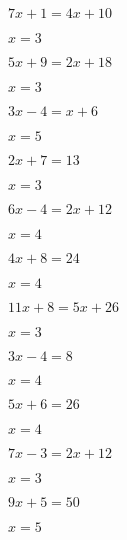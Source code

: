 \documentclass{ximera}
\begin{document}
\begin{exercise}
\begin{xmmulticols}
  \begin{question} \( 7x + 1  =  4x + 10    \) \begin{oplossing} \( x  = 3  \) \end{oplossing} \end{question}
  \begin{question} \( 5x + 9  =  2x + 18    \) \begin{oplossing} \( x  = 3  \) \end{oplossing} \end{question}
  \begin{question} \( 3x - 4  =  x + 6      \) \begin{oplossing} \( x  = 5  \) \end{oplossing} \end{question}
  \begin{question} \( 2x + 7  =  13         \) \begin{oplossing} \( x  = 3  \) \end{oplossing} \end{question}
  \begin{question} \( 6x - 4  =  2x + 12    \) \begin{oplossing} \( x  = 4  \) \end{oplossing} \end{question}
  \begin{question} \( 4x + 8  =  24         \) \begin{oplossing} \( x  = 4  \) \end{oplossing} \end{question}
  \begin{question} \( 11x + 8 =  5x + 26    \) \begin{oplossing} \( x  = 3  \) \end{oplossing} \end{question}
  \begin{question} \( 3x - 4  =  8          \) \begin{oplossing} \( x  = 4  \) \end{oplossing} \end{question}
  \begin{question} \( 5x + 6  =  26         \) \begin{oplossing} \( x  = 4  \) \end{oplossing} \end{question}
  \begin{question} \( 7x - 3  =  2x + 12    \) \begin{oplossing} \( x  = 3  \) \end{oplossing} \end{question}
  \begin{question} \( 9x + 5  =  50         \) \begin{oplossing} \( x  = 5  \) \end{oplossing} \end{question}
  
\end{xmmulticols}
\end{exercise}
\end{document}
